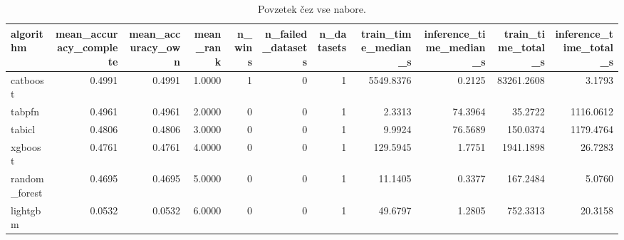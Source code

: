\begin{table}[htbp]
\centering
\caption{Povzetek čez vse nabore.}
\label{tab:overall}
\begin{tabular}{lrrrrrrrrrr}
\hline
algorithm & mean\_accuracy\_complete & mean\_accuracy\_own & mean\_rank & n\_wins & n\_failed\_datasets & n\_datasets & train\_time\_median\_s & inference\_time\_median\_s & train\_time\_total\_s & inference\_time\_total\_s \\
\hline
catboost & 0.4991 & 0.4991 & 1.0000 & 1 & 0 & 1 & 5549.8376 & 0.2125 & 83261.2608 & 3.1793 \\
tabpfn & 0.4961 & 0.4961 & 2.0000 & 0 & 0 & 1 & 2.3313 & 74.3964 & 35.2722 & 1116.0612 \\
tabicl & 0.4806 & 0.4806 & 3.0000 & 0 & 0 & 1 & 9.9924 & 76.5689 & 150.0374 & 1179.4764 \\
xgboost & 0.4761 & 0.4761 & 4.0000 & 0 & 0 & 1 & 129.5945 & 1.7751 & 1941.1898 & 26.7283 \\
random\_forest & 0.4695 & 0.4695 & 5.0000 & 0 & 0 & 1 & 11.1405 & 0.3377 & 167.2484 & 5.0760 \\
lightgbm & 0.0532 & 0.0532 & 6.0000 & 0 & 0 & 1 & 49.6797 & 1.2805 & 752.3313 & 20.3158 \\
\hline
\end{tabular}
\end{table}
